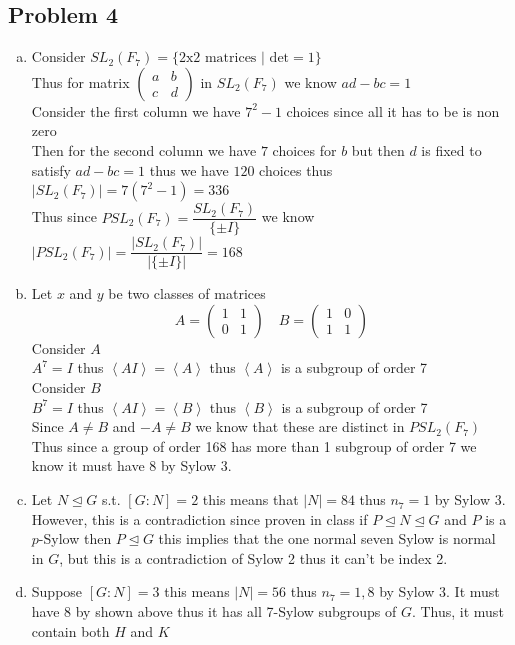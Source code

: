 \documentclass[12pt, letterpaper]{article}
\theoremstyle{definition}
\renewcommand{\t}[1]{\text{#1}}
\newcommand{\ang}[1]{\left\langle #1 \right\rangle}
\begin{document}
\newpage
\subsection*{Problem 4}
\begin{enumerate}[(a)]
    \item Consider $SL_2(F_7) = \{\t{2x2 matrices } | \t{ det} = 1\}$\\
    Thus for matrix $\begin{pmatrix}
        a & b\\
        c & d
    \end{pmatrix}$ in $SL_2(F_7)$ we know $ad-bc=1$\\
    Consider the first column we have $7^2-1$ choices since all it has to be is non zero\\
Then for the second column we have $7$ choices for $b$ but then $d$ is fixed to satisfy $ad-bc=1$ thus we have $120$ choices thus $|SL_2(F_7)|=7(7^2-1)=336$\\
Thus since $PSL_2(F_7)=\dfrac{SL_2(F_7)}{\{\pm I\}}$ we know $|PSL_2(F_7)|=\dfrac{|SL_2(F_7)|}{|\{\pm I\}|}=168$
\item Let $x$ and $y$ be two classes of matrices
\[
A=\begin{pmatrix}
  1 & 1\\
  0 & 1  
\end{pmatrix} \quad
B=\begin{pmatrix}
    1 & 0\\
    1 & 1  
  \end{pmatrix}
\]
Consider $A$\\
$A^7=I$ thus $\ang{AI}=\ang{A}$ thus $\ang{A}$ is a subgroup of order 7\\
Consider $B$\\
$B^7=I$ thus $\ang{AI}=\ang{B}$ thus $\ang{B}$ is a subgroup of order 7\\
Since $A \neq B$ and $-A \neq B$ we know that these are distinct in $PSL_2(F_7)$\\
Thus since a group of order 168 has more than 1 subgroup of order 7 we know it must have 8 by Sylow 3.
\item Let $N \unlhd G$ s.t. $[G : N]=2$ this means that $|N|=84$ thus $n_7=1$ by Sylow 3. However, this is a contradiction since proven in class if $P \unlhd N \unlhd G$ and $P$ is a $p$-Sylow then $P \unlhd G$ this implies that the one normal
seven Sylow is normal in $G$, but this is a contradiction of Sylow 2 thus it can't be index 2.
\item Suppose $[G : N]=3$ this means $|N|=56$ thus $n_7=1,8$ by Sylow 3. It must have 8 by shown above thus it has all 7-Sylow subgroups of $G$. Thus, it must contain both $H$ and $K$\\

\end{enumerate}
\end{document}
